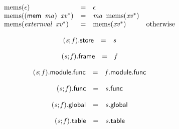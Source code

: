 $$
\begin{array}{@{}lcl@{}l@{}}
{\mathrm{mems}}(\epsilon) &=& \epsilon &  \\
{\mathrm{mems}}((\mathsf{mem}~\,{\mathit{ma}})~\,{{\mathit{xv}}^\ast}) &=& {\mathit{ma}}~\,{\mathrm{mems}}({{\mathit{xv}}^\ast}) &  \\
{\mathrm{mems}}({\mathit{externval}}~\,{{\mathit{xv}}^\ast}) &=& {\mathrm{mems}}({{\mathit{xv}}^\ast}) &\quad
  \mbox{otherwise} \\
\end{array}
$$

\vspace{1ex}

\vspace{1ex}

$$
\begin{array}{@{}lcl@{}l@{}}
({\mathit{s}} ; {\mathit{f}}).\mathsf{store} &=& {\mathit{s}} &  \\
\end{array}
$$

$$
\begin{array}{@{}lcl@{}l@{}}
({\mathit{s}} ; {\mathit{f}}).\mathsf{frame} &=& {\mathit{f}} &  \\
\end{array}
$$

\vspace{1ex}

$$
\begin{array}{@{}lcl@{}l@{}}
({\mathit{s}} ; {\mathit{f}}).\mathsf{module}.\mathsf{func} &=& {\mathit{f}}.\mathsf{module}.\mathsf{func} &  \\
\end{array}
$$

$$
\begin{array}{@{}lcl@{}l@{}}
({\mathit{s}} ; {\mathit{f}}).\mathsf{func} &=& {\mathit{s}}.\mathsf{func} &  \\
\end{array}
$$

$$
\begin{array}{@{}lcl@{}l@{}}
({\mathit{s}} ; {\mathit{f}}).\mathsf{global} &=& {\mathit{s}}.\mathsf{global} &  \\
\end{array}
$$

$$
\begin{array}{@{}lcl@{}l@{}}
({\mathit{s}} ; {\mathit{f}}).\mathsf{table} &=& {\mathit{s}}.\mathsf{table} &  \\
\end{array}
$$

